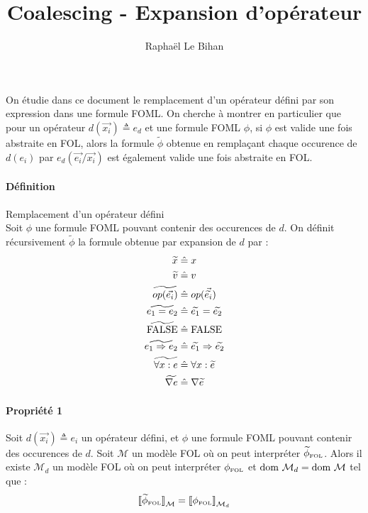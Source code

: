 \documentclass[12pt]{article}
\title{Coalescing - Expansion d'opérateur}
\author{Raphaël Le Bihan}
\newcommand{\defeq}{\ensuremath{\; \hat{=} \;}}
\newcommand{\FOL}{\ensuremath{\textup{\tiny{}FOL}}}
\begin{document}
\maketitle

On étudie dans ce document le remplacement d'un opérateur défini par son expression dans une formule FOML.
On cherche à montrer en particulier que pour un opérateur $d(\vec{x_i}) \triangleq e_d$ et une formule FOML $\phi$, si $\phi$ est valide une fois abstraite en FOL, alors la formule $\widetilde{\phi}$ obtenue en remplaçant chaque occurence de $d(e_i)$ par $e_d(\vec{e_i}/\vec{x_i})$ est également valide une fois abstraite en FOL.

\paragraph{Définition} Remplacement d'un opérateur défini\\
Soit $\phi$ une formule FOML pouvant contenir des occurences de $d$.
On définit récursivement $\widetilde{\phi}$ la formule obtenue par expansion de $d$ par :
\begin{align*}
  \widetilde{x} &\defeq x \\
  \widetilde{v} &\defeq v \\
  \widetilde{op(\vec{e_i})} &\defeq op(\vec{\widetilde{e_i}}) \\
  \widetilde{e_1 = e_2} &\defeq \widetilde{e_1} = \widetilde{e_2} \\
  \widetilde{\textup{FALSE}} &\defeq \textup{FALSE} \\
  \widetilde{e_1 \Rightarrow e_2} &\defeq \widetilde{e_1} \Rightarrow \widetilde{e_2} \\
  \widetilde{\forall x : e } &\defeq \forall x : \widetilde{e} \\
  \widetilde{\nabla e} &\defeq \nabla \widetilde{e}
\end{align*}


\paragraph{Propriété 1}
\label{prop_sem}
Soit $d(\vec{x_i}) \triangleq e_i$ un opérateur défini, et $\phi$ une formule FOML pouvant contenir des occurences de $d$.
Soit $\mathcal{M}$ un modèle FOL où on peut interpréter $\widetilde{\phi}_\FOL$.
Alors il existe $\mathcal{M}_d$ un modèle FOL où on peut interpréter $\phi_\FOL$ et $\textup{dom } \mathcal{M}_d = \textup{dom } \mathcal{M}$ tel que :
\[
  {\llbracket \widetilde{\phi}_\FOL \rrbracket}_{\mathcal{M}} = {\llbracket \phi_\FOL \rrbracket}_{\mathcal{M}_d}
\]
\end{document}
